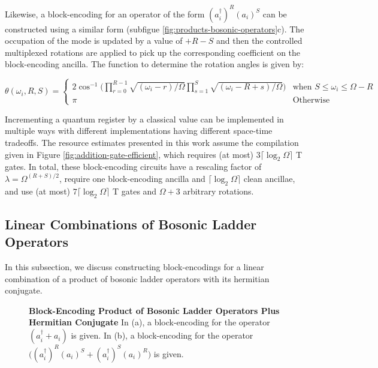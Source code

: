 Likewise, a block-encoding for an operator of the form $(a_i^\dagger)^R (a_i)^S$ can be constructed using a similar form (subfigue \ref{fig:products-bosonic-operators}c).
The occupation of the mode is updated by a value of $+ R - S$ and then the controlled multiplexed rotations are applied to pick up the corresponding coefficient on the block-encoding ancilla.
The function to determine the rotation angles is given by:
\begin{widetext}
\begin{equation}
    \theta(\omega_i, R, S) = 
    \begin{cases} 
        2\cos^{-1}\Big(\prod_{r=0}^{R-1}\sqrt{(\omega_i - r) / \Omega} \prod_{s=1}^{S}\sqrt{(\omega_i - R + s) / \Omega}\Big) & \text{when } S \leq \omega_i \leq \Omega - R \\
        \pi & \text{Otherwise} 
    \end{cases}
\end{equation}
\end{widetext}

Incrementing a quantum register by a classical value can be implemented in multiple ways with different implementations having different space-time tradeoffs.
The resource estimates presented in this work assume the compilation given in Figure \ref{fig:addition-gate-efficient}, which requires (at most) $3 \lceil \log_2 \Omega \rceil$ T gates.
In total, these block-encoding circuits have a rescaling factor of $\lambda = \Omega^{(R+S)/2}$, require one block-encoding ancilla and $\lceil{\log_2{\Omega}}\rceil$ clean ancillae, and use (at most) $7 \lceil \log_2 \Omega \rceil$ T gates and $\Omega + 3$ arbitrary rotations.


\subsection{Linear Combinations of Bosonic Ladder Operators}

In this subsection, we discuss constructing block-encodings for a linear combination of a product of bosonic ladder operators with its hermitian conjugate.


\begin{figure*}
    
    
    \caption{
        \textbf{Block-Encoding Product of Bosonic Ladder Operators Plus Hermitian Conjugate}
        In (a), a block-encoding for the operator $(a_i^\dagger + a_i)$ is given.
        In (b), a block-encoding for the operator $\big((a_i^\dagger)^R (a_i)^S + (a_i^\dagger)^S (a_i)^R\big)$ is given.
    }
    \label{fig:lc-bosonic}
\end{figure*}


